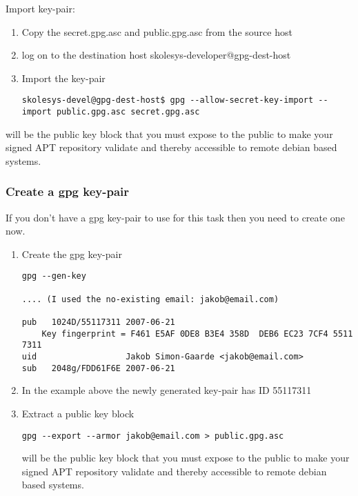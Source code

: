 Import key-pair:

\begin{enumerate}
 \item Copy the secret.gpg.asc and public.gpg.asc from the source host
 \item log on to the destination host skolesys-developer@gpg-dest-host
 \item Import the key-pair
\begin{verbatim}
skolesys-devel@gpg-dest-host$ gpg --allow-secret-key-import --import public.gpg.asc secret.gpg.asc
\end{verbatim}
\end{enumerate}

 will be the public key block that you must expose to the public to make your signed APT repository validate and thereby accessible to remote debian based systems.

\subsubsection{Create a gpg key-pair\label{skolesys-apt-creategpg}}
If you don't have a gpg key-pair to use for this task then you need to create one now.
\begin{enumerate}
 \item Create the gpg key-pair
 \begin{verbatim}
gpg --gen-key

.... (I used the no-existing email: jakob@email.com)

pub   1024D/55117311 2007-06-21
	Key fingerprint = F461 E5AF 0DE8 B3E4 358D  DEB6 EC23 7CF4 5511 7311
uid                  Jakob Simon-Gaarde <jakob@email.com>
sub   2048g/FDD61F6E 2007-06-21
 \end{verbatim}

 \item In the example above the newly generated key-pair has ID 55117311
 \item Extract a public key block	
 \begin{verbatim}
gpg --export --armor jakob@email.com > public.gpg.asc
 \end{verbatim}

  will be the public key block that you must expose to the public to make your signed APT repository validate and thereby accessible to remote debian based systems.

\end{enumerate}

